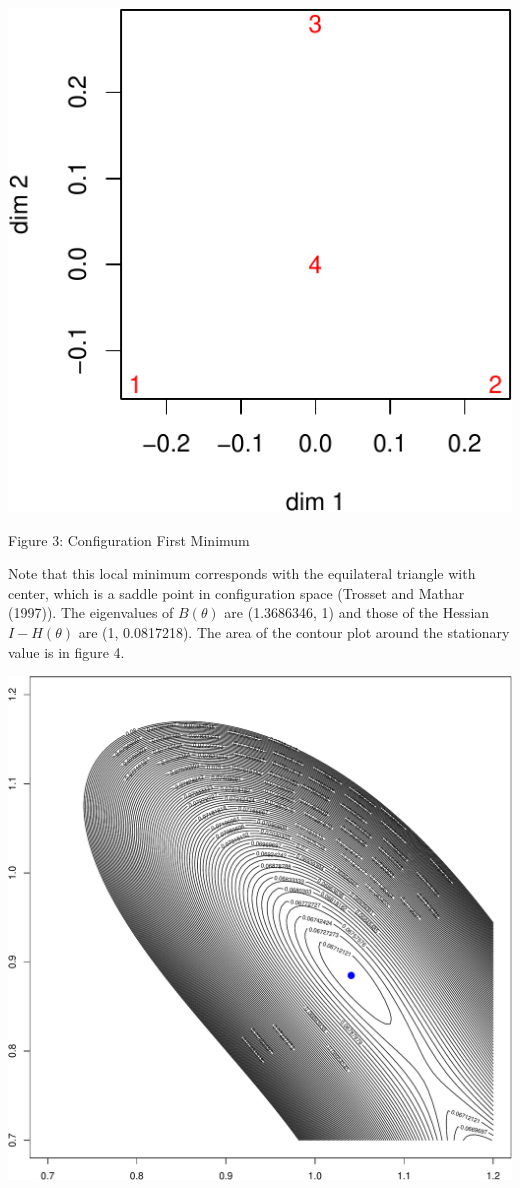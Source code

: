 \documentclass[
  12pt,
]{article}
\begin{document}
\begin{center}\includegraphics{twoPoints_files/figure-latex/configuration_first_minimum-1} \end{center}

Figure 3: Configuration First Minimum

Note that this local minimum corresponds with the equilateral triangle with center, which is a saddle point in configuration space (Trosset and Mathar (1997)).
The eigenvalues of \(B(\theta)\) are (1.3686346, 1) and those of the Hessian \(I-H(\theta)\) are
(1, 0.0817218). The area of the contour plot around the stationary value is in figure 4.

\begin{center}\includegraphics{twoPoints_files/figure-latex/contour_first_minimum-1} \end{center}
\end{document}
